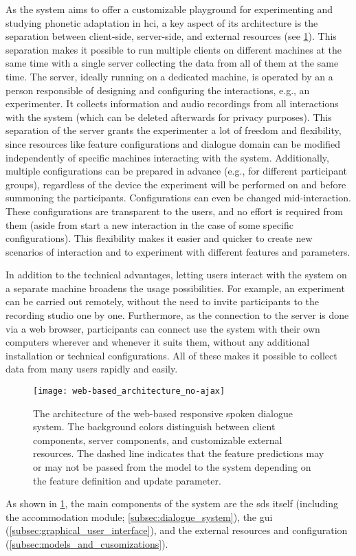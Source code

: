 As the system aims to offer a customizable playground for experimenting and studying phonetic adaptation in \ac{hci}, a key aspect of its architecture is the separation between client-side, server-side, and external resources (see \cref{fig:web-based_architecture}).
This separation makes it possible to run multiple clients on different machines at the same time with a single server collecting the data from all of them at the same time.
The server, ideally running on a dedicated machine, is operated by an a person responsible of designing and configuring the interactions, e.g., an experimenter.
It collects information and audio recordings from all interactions with the system (which can be deleted afterwards for privacy purposes).
This separation of the server grants the experimenter a lot of freedom and flexibility, since resources like feature configurations and dialogue domain can be modified independently of specific machines interacting with the system.
Additionally, multiple configurations can be prepared in advance (e.g., for different participant groups), regardless of the device the experiment will be performed on and before summoning the participants.
Configurations can even be changed mid-interaction.
These configurations are transparent to the users, and no effort is required from them (aside from start a new interaction in the case of some specific configurations).
This flexibility makes it easier and quicker to create new scenarios of interaction and to experiment with different features and parameters.

In addition to the technical advantages, letting users interact with the system on a separate machine broadens the usage possibilities.
For example, an experiment can be carried out remotely, without the need to invite participants to the recording studio one by one.
Furthermore, as the connection to the server is done via a web browser, participants can connect use the system with their own computers wherever and whenever it suits them, without any additional installation or technical configurations.
All of these makes it possible to collect data from many users rapidly and easily.
%
\begin{figure}[t]
	\centering
	\texttt{[image: web-based\_architecture\_no-ajax]}
	\caption[Architecture of a web-based responsive spoken dialogue system]
		{The architecture of the web-based responsive spoken dialogue system.
		The background colors distinguish between client components, server components, and customizable external resources.
		The dashed line indicates that the feature predictions may or may not be passed from the model to the system depending on the feature definition and update parameter.}
	\label{fig:web-based_architecture}
\end{figure}
%
As shown in \cref{fig:web-based_architecture}, the main components of the system are the \ac{sds} itself (including the accommodation module; \cref{subsec:dialogue_system}), the \ac{gui} (\cref{subsec:graphical_user_interface}), and the external resources and configuration (\cref{subsec:models_and_cusomizations}).

